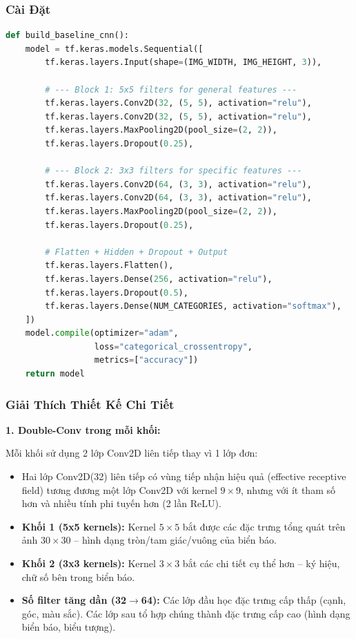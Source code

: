 \documentclass[12pt,a4paper]{article}
\begin{document}
\subsubsection*{Cài Đặt}
\begin{lstlisting}[language=Python, caption={Hàm \texttt{build\_baseline\_cnn()} -- Model A.}, label=lst:model_a]
def build_baseline_cnn():
    model = tf.keras.models.Sequential([
        tf.keras.layers.Input(shape=(IMG_WIDTH, IMG_HEIGHT, 3)),

        # --- Block 1: 5x5 filters for general features ---
        tf.keras.layers.Conv2D(32, (5, 5), activation="relu"),
        tf.keras.layers.Conv2D(32, (5, 5), activation="relu"),
        tf.keras.layers.MaxPooling2D(pool_size=(2, 2)),
        tf.keras.layers.Dropout(0.25),

        # --- Block 2: 3x3 filters for specific features ---
        tf.keras.layers.Conv2D(64, (3, 3), activation="relu"),
        tf.keras.layers.Conv2D(64, (3, 3), activation="relu"),
        tf.keras.layers.MaxPooling2D(pool_size=(2, 2)),
        tf.keras.layers.Dropout(0.25),

        # Flatten + Hidden + Dropout + Output
        tf.keras.layers.Flatten(),
        tf.keras.layers.Dense(256, activation="relu"),
        tf.keras.layers.Dropout(0.5),
        tf.keras.layers.Dense(NUM_CATEGORIES, activation="softmax"),
    ])
    model.compile(optimizer="adam",
                  loss="categorical_crossentropy",
                  metrics=["accuracy"])
    return model
\end{lstlisting}

\subsubsection*{Giải Thích Thiết Kế Chi Tiết}

\textbf{1. Double-Conv trong mỗi khối:}

Mỗi khối sử dụng 2 lớp Conv2D liên tiếp thay vì 1 lớp đơn:
\begin{itemize}
    \item Hai lớp Conv2D(32) liên tiếp có vùng tiếp nhận hiệu quả (effective receptive field) tương đương một lớp Conv2D với kernel $9\times9$, nhưng với ít tham số hơn và nhiều tính phi tuyến hơn (2 lần ReLU).
    \item \textbf{Khối 1 (5x5 kernels):} Kernel $5\times5$ bắt được các đặc trưng tổng quát trên ảnh $30\times30$ -- hình dạng tròn/tam giác/vuông của biển báo.
    \item \textbf{Khối 2 (3x3 kernels):} Kernel $3\times3$ bắt các chi tiết cụ thể hơn -- ký hiệu, chữ số bên trong biển báo.
    \item \textbf{Số filter tăng dần (32$\to$64):} Các lớp đầu học đặc trưng cấp thấp (cạnh, góc, màu sắc). Các lớp sau tổ hợp chúng thành đặc trưng cấp cao (hình dạng biển báo, biểu tượng).
\end{itemize}
\end{document}
